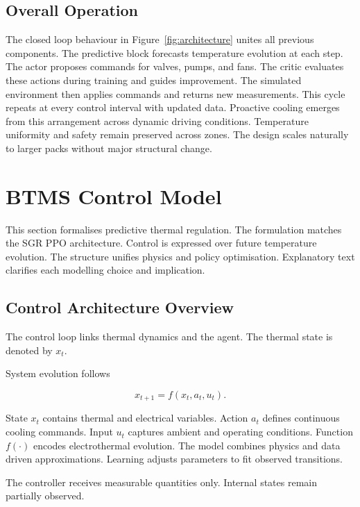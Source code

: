 \documentclass{article}
\begin{document}
\subsection{Overall Operation}

The closed loop behaviour in Figure~\ref{fig:architecture} unites all previous components.
The predictive block forecasts temperature evolution at each step.
The actor proposes commands for valves, pumps, and fans.
The critic evaluates these actions during training and guides improvement.
The simulated environment then applies commands and returns new measurements.
This cycle repeats at every control interval with updated data.
Proactive cooling emerges from this arrangement across dynamic driving conditions.
Temperature uniformity and safety remain preserved across zones.
The design scales naturally to larger packs without major structural change.

\section{BTMS Control Model}

This section formalises predictive thermal regulation.
The formulation matches the SGR PPO architecture.
Control is expressed over future temperature evolution.
The structure unifies physics and policy optimisation.
Explanatory text clarifies each modelling choice and implication.

\subsection{Control Architecture Overview}

The control loop links thermal dynamics and the agent.
The thermal state is denoted by \(x_t\).

System evolution follows

\begin{equation}
x_{t+1} = f(x_t, a_t, u_t).
\end{equation}

State \(x_t\) contains thermal and electrical variables.
Action \(a_t\) defines continuous cooling commands.
Input \(u_t\) captures ambient and operating conditions.
Function \(f(\cdot)\) encodes electrothermal evolution.
The model combines physics and data driven approximations.
Learning adjusts parameters to fit observed transitions.

The controller receives measurable quantities only.
Internal states remain partially observed.
\end{document}

